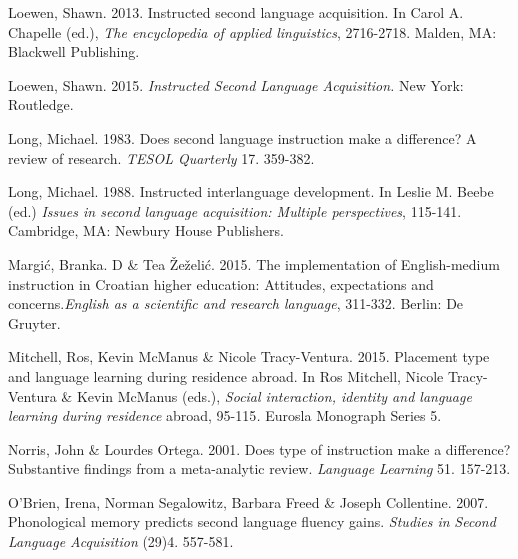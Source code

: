 \begin{styleStandard}
Loewen, Shawn. 2013. Instructed second language acquisition. In Carol A. Chapelle (ed.), \textit{The encyclopedia of applied linguistics}, 2716-2718. Malden, MA: Blackwell Publishing.
\end{styleStandard}


\begin{styleStandard}
Loewen, Shawn. 2015. \textit{Instructed Second Language Acquisition.} New York: Routledge.
\end{styleStandard}


\begin{styleStandard}
Long, Michael. 1983. Does second language instruction make a difference? A review of research. \textit{TESOL Quarterly} 17. 359-382.
\end{styleStandard}


\begin{styleStandard}
Long, Michael. 1988. Instructed interlanguage development. In Leslie M. Beebe (ed.) \textit{Issues in second language acquisition: Multiple perspectives}, 115-141. Cambridge, MA: Newbury House Publishers. 
\end{styleStandard}


\begin{styleStandard}
Margić, Branka. D \& Tea Žeželić. 2015. The implementation of English-medium instruction in Croatian higher education: Attitudes, expectations and concerns.\textit{English as a scientific and research language}, 311-332. Berlin: De Gruyter. 
\end{styleStandard}


\begin{styleStandard}
Mitchell, Ros, Kevin McManus \& Nicole Tracy-Ventura. 2015. Placement type and language learning during residence abroad. In Ros Mitchell, Nicole Tracy-Ventura \& Kevin McManus (eds.), \textit{Social interaction, identity and language learning during residence }abroad, 95-115\textit{. }Eurosla Monograph Series 5.
\end{styleStandard}


\begin{styleStandard}
Norris, John \& Lourdes Ortega. 2001. Does type of instruction make a difference? Substantive findings from a meta-analytic review. \textit{Language Learning} 51. 157-213.
\end{styleStandard}


\begin{styleStandard}
O’Brien, Irena, Norman Segalowitz, Barbara Freed \& Joseph Collentine. 2007. Phonological memory predicts second language fluency gains. \textit{Studies in }\textit{Second Language Acquisition }(29)4. 557-581. 
\end{styleStandard}


